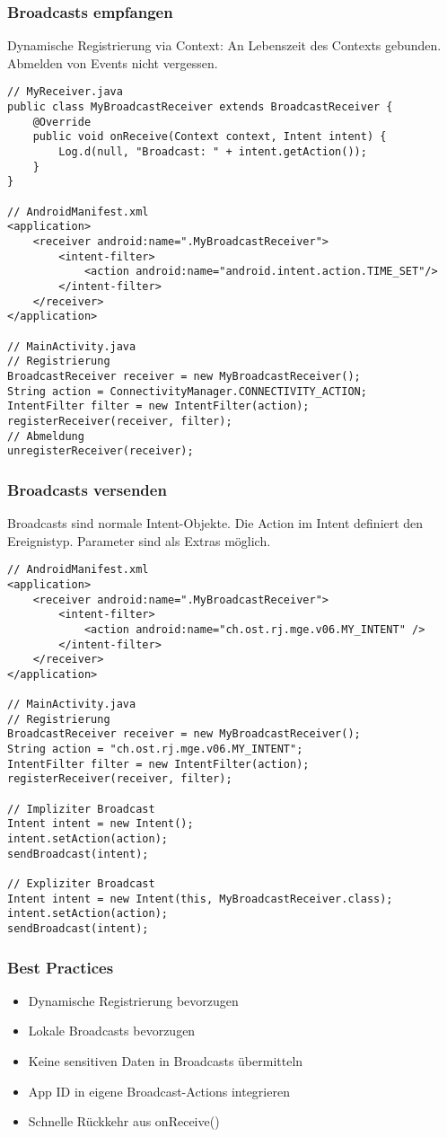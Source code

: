 \subsubsection{Broadcasts empfangen}
Dynamische Registrierung via Context: An Lebenszeit des Contexts gebunden. Abmelden von Events nicht vergessen.
\begin{lstlisting}
// MyReceiver.java
public class MyBroadcastReceiver extends BroadcastReceiver {
    @Override
    public void onReceive(Context context, Intent intent) {
        Log.d(null, "Broadcast: " + intent.getAction());
    }
}

// AndroidManifest.xml
<application>
    <receiver android:name=".MyBroadcastReceiver">
        <intent-filter>
            <action android:name="android.intent.action.TIME_SET"/>
        </intent-filter>
    </receiver>
</application>

// MainActivity.java
// Registrierung
BroadcastReceiver receiver = new MyBroadcastReceiver();
String action = ConnectivityManager.CONNECTIVITY_ACTION;
IntentFilter filter = new IntentFilter(action);
registerReceiver(receiver, filter);
// Abmeldung
unregisterReceiver(receiver);
\end{lstlisting}
\subsubsection{Broadcasts versenden}
Broadcasts sind normale Intent-Objekte. Die Action im Intent definiert den Ereignistyp. Parameter sind als Extras möglich.
\begin{lstlisting}
// AndroidManifest.xml
<application>
    <receiver android:name=".MyBroadcastReceiver">
        <intent-filter>
            <action android:name="ch.ost.rj.mge.v06.MY_INTENT" />
        </intent-filter>
    </receiver>
</application>

// MainActivity.java
// Registrierung
BroadcastReceiver receiver = new MyBroadcastReceiver();
String action = "ch.ost.rj.mge.v06.MY_INTENT";
IntentFilter filter = new IntentFilter(action);
registerReceiver(receiver, filter);

// Impliziter Broadcast
Intent intent = new Intent();
intent.setAction(action);
sendBroadcast(intent);

// Expliziter Broadcast
Intent intent = new Intent(this, MyBroadcastReceiver.class);
intent.setAction(action);
sendBroadcast(intent);
\end{lstlisting}
\subsubsection{Best Practices}
\begin{itemize}[topsep=0pt, leftmargin=4mm]
    \setlength\itemsep{-0.3em}
    \item Dynamische Registrierung bevorzugen
    \item Lokale Broadcasts bevorzugen
    \item Keine sensitiven Daten in Broadcasts übermitteln
    \item App ID in eigene Broadcast-Actions integrieren
    \item Schnelle Rückkehr aus onReceive()
\end{itemize}

